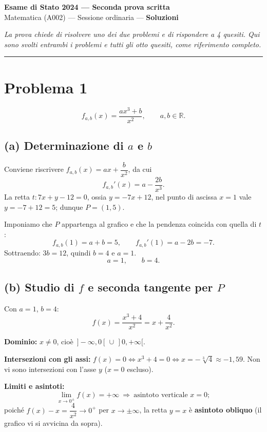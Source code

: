 \documentclass[11pt]{article}
\begin{document}
\begin{center}
  {\Large\textbf{Esame di Stato 2024 --- Seconda prova scritta}}\\[2pt]
  {\large Matematica (A002) --- Sessione ordinaria --- \textbf{Soluzioni}}
\end{center}

\medskip

\noindent\emph{La prova chiede di risolvere uno dei due problemi e di rispondere a
4 quesiti. Qui sono svolti entrambi i problemi e tutti gli otto quesiti, come
riferimento completo.}

\bigskip
\hrule
\bigskip

\section*{Problema 1}

\[
f_{a,b}(x)=\frac{ax^3+b}{x^2},\qquad a,b\in\mathbb{R}.
\]

\subsection*{(a) Determinazione di \texorpdfstring{$a$}{a} e \texorpdfstring{$b$}{b}}

Conviene riscrivere $f_{a,b}(x)=ax+\dfrac{b}{x^2}$, da cui
\[
f_{a,b}'(x)=a-\frac{2b}{x^3}.
\]
La retta $t\colon 7x+y-12=0$, ossia $y=-7x+12$, nel punto di ascissa $x=1$ vale
$y=-7+12=5$; dunque $P=(1,5)$.

Imponiamo che $P$ appartenga al grafico e che la pendenza coincida con quella di $t$:
\[
f_{a,b}(1)=a+b=5,\qquad f_{a,b}'(1)=a-2b=-7.
\]
Sottraendo: $3b=12$, quindi $b=4$ e $a=1$.
\[
\boxed{a=1,\qquad b=4.}
\]

\subsection*{(b) Studio di \texorpdfstring{$f$}{f} e seconda tangente per \texorpdfstring{$P$}{P}}

Con $a=1$, $b=4$:
\[
f(x)=\frac{x^3+4}{x^2}=x+\frac{4}{x^2}.
\]

\textbf{Dominio:} $x\neq 0$, cio\`e $\,]-\infty,0[\,\cup\,]0,+\infty[$.

\textbf{Intersezioni con gli assi:} $f(x)=0\iff x^3+4=0\iff x=-\sqrt[3]{4}\approx-1{,}59$.
Non vi sono intersezioni con l'asse $y$ ($x=0$ escluso).

\textbf{Limiti e asintoti:}
\[
\lim_{x\to0^{\pm}}f(x)=+\infty\ \Rightarrow\ \text{asintoto verticale } x=0;
\]
poich\'e $f(x)-x=\dfrac{4}{x^2}\to0^{+}$ per $x\to\pm\infty$, la retta $y=x$ \`e
\textbf{asintoto obliquo} (il grafico vi si avvicina da sopra).
\end{document}
